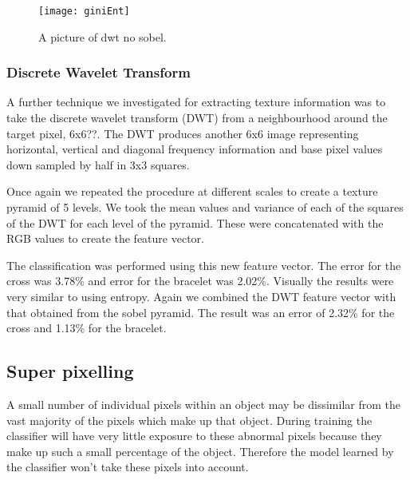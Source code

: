 \documentclass[12pt]{IIBproject}
\begin{document}
\begin{figure}[H]
  \caption{A picture of dwt no sobel.}
  \centering
    \texttt{[image: giniEnt]}
\end{figure}

\subsubsection{Discrete Wavelet Transform}

A further technique we investigated for extracting texture information was to take the discrete wavelet transform (DWT)\cite{shensa1992discrete} from a neighbourhood around the target pixel,  6x6??. The DWT produces another 6x6 image representing horizontal, vertical and diagonal frequency information and base pixel values down sampled by half in 3x3 squares. 

Once again we repeated the procedure at different scales to create a texture pyramid of 5 levels. We took the mean values and variance of each of the squares of the DWT for each level of the pyramid. These were concatenated with the RGB values to create the feature vector. 

The classification was performed using this new feature vector. The error for the cross was 3.78\% and error for the bracelet was 2.02\%. Visually the results were very similar to using entropy. Again we combined the DWT feature vector with that obtained from the sobel pyramid. The result was an error of 2.32\% for the cross and 1.13\% for the bracelet. 



\subsection{Super pixelling}
A small number of individual pixels within an object may be dissimilar from the vast majority of the pixels which make up that object. During training the classifier will have very little exposure to these abnormal pixels because they make up such a small percentage of the object. Therefore the model learned by the classifier won't take these pixels into account. 
\end{document}

